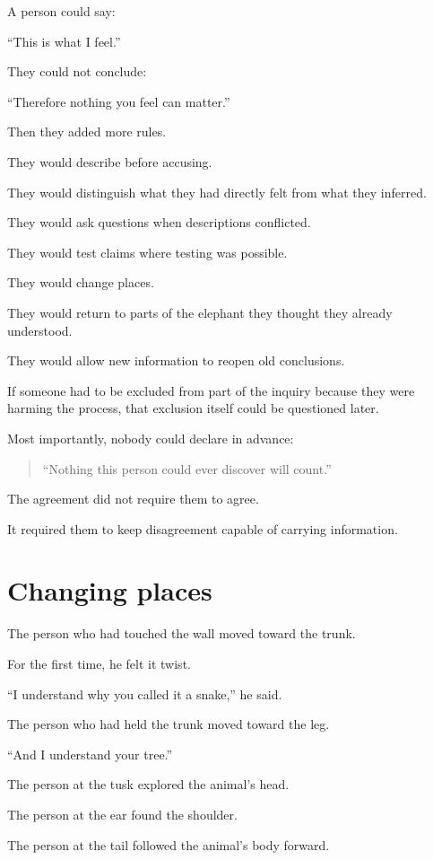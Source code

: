 \documentclass[11pt,a4paper]{article}
\begin{document}
A person could say:

``This is what I feel.''

They could not conclude:

``Therefore nothing you feel can matter.''

Then they added more rules.

They would describe before accusing.

They would distinguish what they had directly felt from what they inferred.

They would ask questions when descriptions conflicted.

They would test claims where testing was possible.

They would change places.

They would return to parts of the elephant they thought they already understood.

They would allow new information to reopen old conclusions.

If someone had to be excluded from part of the inquiry because they were harming the process, that exclusion itself could be questioned later.

Most importantly, nobody could declare in advance:

\begin{quote}
``Nothing this person could ever discover will count.''
\end{quote}

The agreement did not require them to agree.

It required them to keep disagreement capable of carrying information.

\section*{Changing places}

The person who had touched the wall moved toward the trunk.

For the first time, he felt it twist.

``I understand why you called it a snake,'' he said.

The person who had held the trunk moved toward the leg.

``And I understand your tree.''

The person at the tusk explored the animal's head.

The person at the ear found the shoulder.

The person at the tail followed the animal's body forward.
\end{document}

